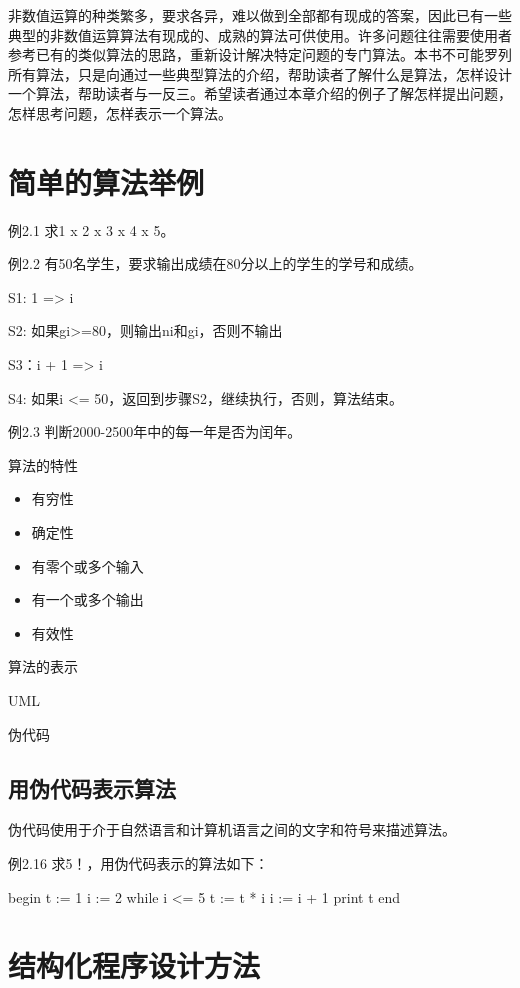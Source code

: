 \begin{lslisting}
\begin{enumerate}
非数值运算的种类繁多，要求各异，难以做到全部都有现成的答案，因此已有一些典型的非数值运算算法有现成的、成熟的算法可供使用。许多问题往往需要使用者参考已有的类似算法的思路，重新设计解决特定问题的专门算法。本书不可能罗列所有算法，只是向通过一些典型算法的介绍，帮助读者了解什么是算法，怎样设计一个算法，帮助读者与一反三。希望读者通过本章介绍的例子了解怎样提出问题，怎样思考问题，怎样表示一个算法。

\section{简单的算法举例}

例2.1 求1 x 2 x 3 x 4 x 5。

例2.2 有50名学生，要求输出成绩在80分以上的学生的学号和成绩。

S1: 1 => i

S2: 如果gi>=80，则输出ni和gi，否则不输出

S3：i + 1 => i

S4: 如果i <= 50，返回到步骤S2，继续执行，否则，算法结束。

例2.3 判断2000-2500年中的每一年是否为闰年。

算法的特性
\begin{itemize}
	\item 有穷性
	\item 确定性
	\item 有零个或多个输入
	\item 有一个或多个输出
	\item 有效性
\end{itemize}

算法的表示

UML

伪代码

\subsection{用伪代码表示算法}

伪代码使用于介于自然语言和计算机语言之间的文字和符号来描述算法。

例2.16 求5！，用伪代码表示的算法如下：
\begin{lslisting}
begin
t := 1
i := 2
while i <= 5
{
	t := t * i
	i := i + 1
}
print t
end
\end{lslisting}

\section{结构化程序设计方法}


\end{enumerate}
\end{lslisting}
